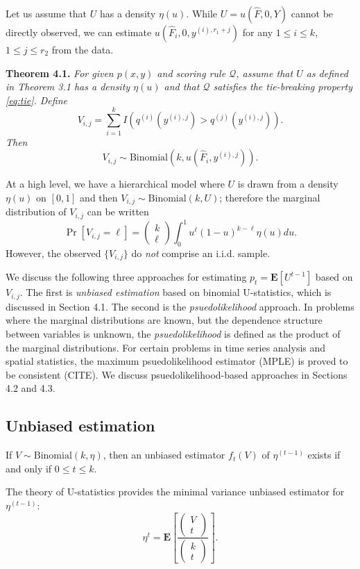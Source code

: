 \documentclass{article}
\newcommand{\E}{\textbf{E}}
\begin{document}
Let us assume that $U$ has a density $\eta(u)$.  While $U = u(\hat{F},
0, Y)$ cannot be directly observed, we can estimate $u(\hat{F}_i, 0,
y^{(i), r_1 + j})$ for any $1 \leq i \leq k$, $1 \leq j \leq r_2$ from
the data.

\noindent\textbf{Theorem 4.1.}\emph{
For given $p(x, y)$ and scoring rule $\mathcal{Q}$, assume that $U$ as defined in Theorem 3.1 has a density $\eta(u)$
and that $\mathcal{Q}$ satisfies the tie-breaking property \eqref{eq:tie}.
Define
\[
V_{i, j} = \sum_{i=1}^k I(q^{(i)}(y^{(i), j}) > q^{(j)}(y^{(i), j})).
\]
Then
\[
V_{i, j} \sim \text{Binomial}(k, u(\hat{F}_i, y^{(i), j})).
\]}

At a high level, we have a hierarchical model where $U$ is drawn from a density $\eta(u)$ on $[0, 1]$
and then $V_{i, j} \sim \text{Binomial}(k, U)$;
therefore the marginal distribution of $V_{i, j}$ can be written
\[
\Pr[V_{i,j} = \ell] = \begin{pmatrix}
k \\ \ell
\end{pmatrix}
\int_0^1 u^\ell (1-u)^{k-\ell} \eta(u) du.
\]
However, the observed $\{V_{i, j}\}$ do \emph{not} comprise an i.i.d. sample.

We discuss the following three approaches for estimating $p_t =
\E[U^{t-1}]$ based on $V_{i, j}$.  The first is \emph{unbiased
  estimation} based on binomial U-statistics, which is discussed in
Section 4.1.  The second is the \emph{psuedolikelihood} approach.  In
problems where the marginal distributions are known, but the
dependence structure between variables is unknown, the
\emph{psuedolikelihood} is defined as the product of the marginal
distributions.  For certain problems in time series analysis and
spatial statistics, the maximum psuedolikelihood estimator (MPLE) is
proved to be consistent (CITE).  We discuss psuedolikelihood-based
approaches in Sections 4.2 and 4.3.  

\subsection{Unbiased estimation}

If $V \sim \text{Binomial}(k, \eta)$, then an unbiased estimator $f_t(V)$ of $\eta^(t-1)$ exists
if and only if $0 \leq t \leq k$.

The theory of U-statistics provides the minimal variance unbiased estimator for $\eta^(t-1)$:
\[
\eta^t = \E\left[\frac{\begin{pmatrix}
V \\ t
\end{pmatrix}}{\begin{pmatrix}
k \\ t
\end{pmatrix}}\right].
\]
\end{document}
